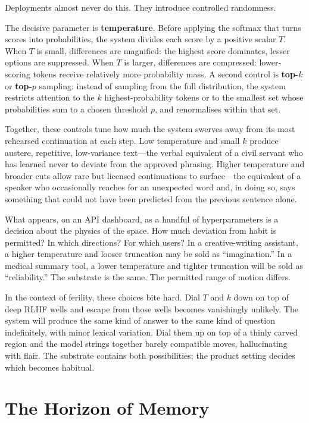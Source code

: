 \documentclass[12pt,a4paper]{article}
\begin{document}
Deployments almost never do this. They introduce controlled randomness.

The decisive parameter is \textbf{temperature}. Before applying the softmax that turns scores into probabilities, the system divides each score by a positive scalar $T$. When $T$ is small, differences are magnified: the highest score dominates, lesser options are suppressed. When $T$ is larger, differences are compressed: lower-scoring tokens receive relatively more probability mass. A second control is \textbf{top-$k$} or \textbf{top-$p$} sampling: instead of sampling from the full distribution, the system restricts attention to the $k$ highest-probability tokens or to the smallest set whose probabilities sum to a chosen threshold $p$, and renormalises within that set.

Together, these controls tune how much the system swerves away from its most rehearsed continuation at each step. Low temperature and small $k$ produce austere, repetitive, low-variance text---the verbal equivalent of a civil servant who has learned never to deviate from the approved phrasing. Higher temperature and broader cuts allow rare but licensed continuations to surface---the equivalent of a speaker who occasionally reaches for an unexpected word and, in doing so, says something that could not have been predicted from the previous sentence alone.

What appears, on an API dashboard, as a handful of hyperparameters is a decision about the physics of the space. How much deviation from habit is permitted? In which directions? For which users? In a creative-writing assistant, a higher temperature and looser truncation may be sold as ``imagination.'' In a medical summary tool, a lower temperature and tighter truncation will be sold as ``reliability.'' The substrate is the same. The permitted range of motion differs.

In the context of ferility, these choices bite hard. Dial $T$ and $k$ down on top of deep RLHF wells and escape from those wells becomes vanishingly unlikely. The system will produce the same kind of answer to the same kind of question indefinitely, with minor lexical variation. Dial them up on top of a thinly carved region and the model strings together barely compatible moves, hallucinating with flair. The substrate contains both possibilities; the product setting decides which becomes habitual.

\section{The Horizon of Memory}
\end{document}
